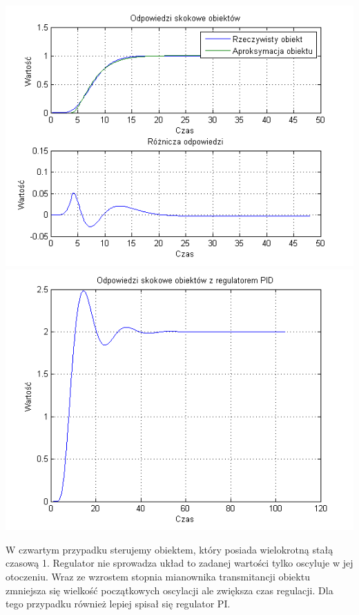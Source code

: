 \documentclass[10pt,a4paper]{article}
\begin{document}
\begin{center}
\includegraphics[scale=1]{images/dwa/skrypt_115.png}\\
\includegraphics[scale=1]{images/dwa/skrypt_116.png}\\
\end{center}
\newpage
W czwartym przypadku sterujemy obiektem, który posiada wielokrotną stałą czasową 1. Regulator nie sprowadza układ to zadanej wartości tylko oscyluje w jej otoczeniu. Wraz ze wzrostem stopnia mianownika transmitancji obiektu zmniejsza się wielkość początkowych oscylacji ale zwiększa czas regulacji. Dla tego przypadku również lepiej spisał się regulator PI.
\newpage
\end{document}
